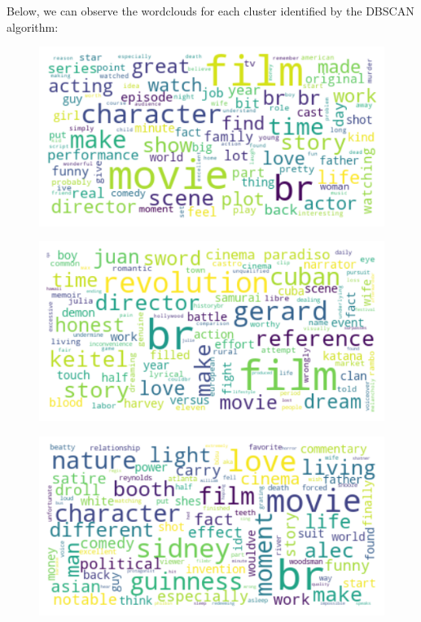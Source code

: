 \documentclass[fleqn,10pt]{SelfArx} %
\begin{document}
Below, we can observe the wordclouds for each cluster identified by the DBSCAN algorithm:

\begin{figure}[H]
\begin{center}
  \includegraphics[scale=0.5]{./images/dbscan_wordcloud1.png}
\end{center}
\end{figure}

\begin{figure}[H]
\begin{center}
  \includegraphics[scale=0.5]{./images/dbscan_wordcloud2.png}
\end{center}
\end{figure}

\begin{figure}[H]
\begin{center}
  \includegraphics[scale=0.5]{./images/dbscan_wordcloud3.png}
\end{center}
\end{figure}
\end{document}
